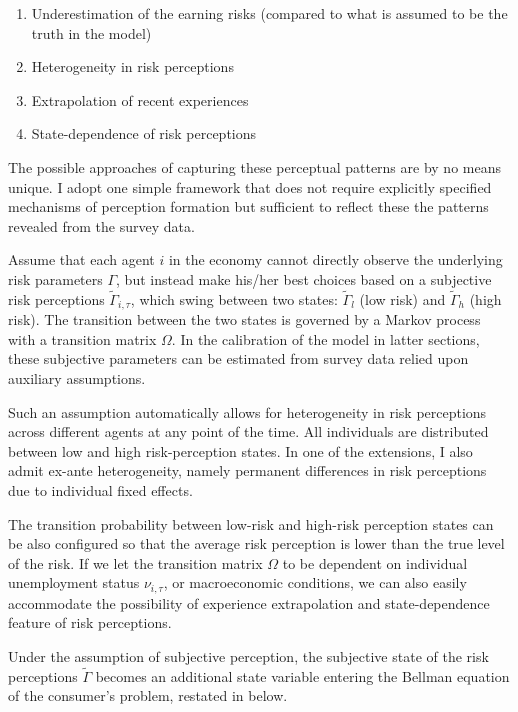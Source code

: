 \begin{enumerate}
    \item Underestimation of the earning risks (compared to what is assumed to be the truth in the model) 
    \item Heterogeneity in risk perceptions 
    \item Extrapolation of recent experiences
    \item State-dependence of risk perceptions 
\end{enumerate}

The possible approaches of capturing these perceptual patterns are by no means unique. I adopt one simple framework that does not require explicitly specified mechanisms of perception formation but sufficient to reflect these the patterns revealed from the survey data.

Assume that each agent $i$ in the economy cannot directly observe the underlying risk parameters $\Gamma$, but instead make his/her best choices based on a subjective risk perceptions  $\tilde \Gamma_{i,\tau}$, which swing between two states: $\tilde \Gamma_l$ (low risk) and $\tilde \Gamma_h$ (high risk). The transition between the two states is governed by a Markov process with a transition matrix $\Omega$. In the calibration of the model in latter sections, these subjective parameters can be estimated from survey data relied upon auxiliary assumptions. 

Such an assumption automatically allows for heterogeneity in risk perceptions across different agents at any point of the time. All individuals are distributed between low and high risk-perception states. In one of the extensions, I also admit ex-ante heterogeneity, namely permanent differences in risk perceptions due to individual fixed effects.  

The transition probability between low-risk and high-risk perception states can be also configured so that the average risk perception is lower than the true level of the risk. If we let the transition matrix $\Omega$ to be dependent on individual unemployment status $\nu_{i,\tau}$, or macroeconomic conditions, we can also easily accommodate the possibility of experience extrapolation and state-dependence feature of risk perceptions. 

Under the assumption of subjective perception, the subjective state of the risk perceptions $\tilde \Gamma$ becomes an additional state variable entering the Bellman equation of the consumer's problem, restated in below.

